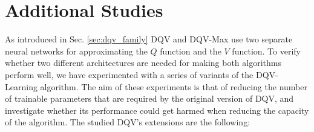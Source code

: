 





\section{Additional Studies}
\label{sec:ijcnn_additional_studies}

As introduced in Sec. \ref{sec:dqv_family} DQV and DQV-Max use two separate neural networks for approximating the $Q$ function and the $V$ function. To verify whether two different architectures are needed for making both algorithms perform well, we have experimented with a series of variants of the DQV-Learning algorithm. The aim of these experiments is that of reducing the number of trainable parameters that are required by the original version of DQV, and investigate whether its performance could get harmed when reducing the capacity of the algorithm.
The studied DQV's extensions are the following:

